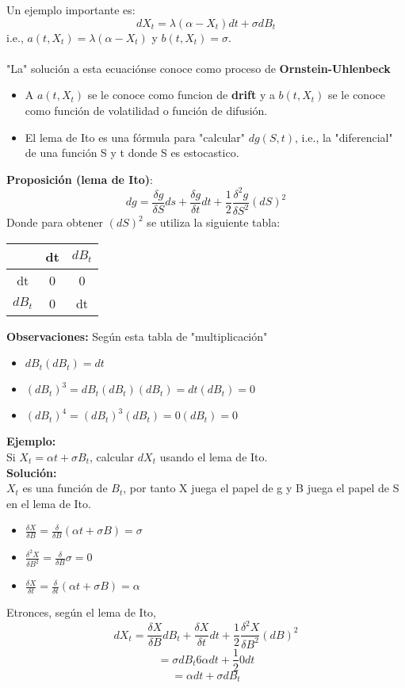 \documentclass[12pts]{extarticle}
\begin{document}
Un ejemplo importante es: $$dX_t =\lambda (\alpha -X_t)dt +\sigma dB_t $$
i.e., $a(t, X_t)=\lambda (\alpha-X_t)$ y $b(t,X_t)=\sigma$. \\ \\
"La" solución a esta ecuaciónse conoce como proceso de \textbf{Ornstein-Uhlenbeck} \\
\begin{itemize}
\item A $a(t,X_t)$ se le conoce como funcion de \textbf{drift} y a $b(t,X_t)$ se le conoce como función de volatilidad o función de difusión. 
\item El lema de Ito es una fórmula para "calcular" $dg(S,t)$, i.e., la "diferencial" de una función S y t donde S es estocastico. 
\end{itemize}
\textbf{Proposición (lema de Ito)}: 
$$dg=\frac{\delta g}{\delta S} ds + \frac{\delta g}{\delta t} dt +\frac{1}{2} \frac{\delta^2 g}{\delta S^2} (dS)^2 $$
Donde para obtener $(dS)^2$ se utiliza la siguiente tabla: 
\begin{center}
 \begin{tabular}{||c c c ||} 
 \hline
  & dt & $dB_t$\\ [0.5ex] 
 \hline\hline
 dt & 0 & 0 \\ 
 \hline
$dB_t$ & 0 & dt \\
 \hline
\end{tabular}
\end{center}

\textbf{Observaciones:} Según esta tabla de "multiplicación" 
\begin{itemize}
\item $dB_t(dB_t)=dt$ 
\item $(dB_t)^3 = dB_t(dB_t)(dB_t)=dt(dB_t)=0$ 
\item $(dB_t)^4=(dB_t)^3(dB_t)=0(dB_t)=0$
\end{itemize}

\textbf{Ejemplo:} \\
Si $X_t=\alpha t +  \sigma B_t $, calcular $dX_t$ usando el lema de Ito. \\
\textbf{Solución:} \\
$X_t$ es una función de $B_t$, por tanto X juega el papel de g y B juega el papel de S en el lema de Ito. 

\begin{itemize}
\item $\frac{\delta X}{\delta B}=\frac{\delta}{\delta B} (\alpha t +\sigma B) =\sigma $
\item $\frac{\delta^2 X}{\delta B^2}=\frac{\delta}{\delta B}\sigma =0$
\item $\frac{\delta X}{\delta t}=\frac{\delta}{\delta t}(\alpha t+\sigma B)=\alpha $
\end{itemize}
Etronces, según el lema de Ito, $$ dX_t=\frac{\delta X}{\delta B} dB_t + \frac{\delta X}{\delta t} dt + \frac{1}{2} \frac{\delta^2 X}{\delta B^2} (dB)^2 $$
$$= \sigma dB_t 6 \alpha dt + \frac{1}{2} 0 dt $$ 
$$=\alpha dt + \sigma dB_t$$
\end{document}
